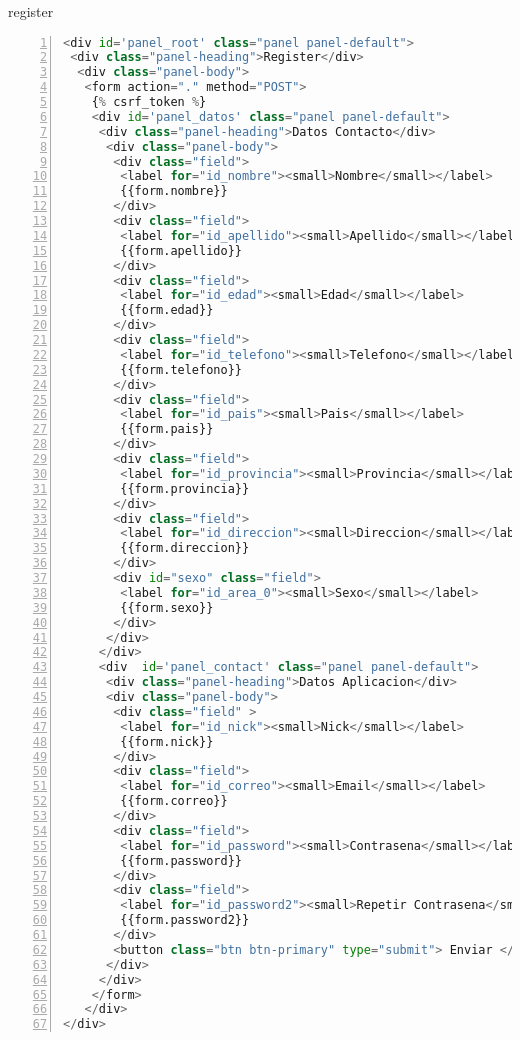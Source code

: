 register
\begin{lstlisting}[framerule=0pt,
aboveskip=0.5cm,
framextopmargin=3pt,
framexbottommargin=3pt,
framexleftmargin=0.4cm,
framesep=0pt,
rulesep=.4pt,
numbers=left,
numbersep=15pt,
numberstyle=\tiny,
numberfirstline = false,
breaklines=true,
frame=single,
stringstyle=\ttfamily,
showstringspaces = false,
basicstyle=\small\ttfamily,
keywordstyle=\bfseries,
rulesepcolor=\color{black},
captionpos=b,
language=Python,
caption=Register formato HTML.]
<div id='panel_root' class="panel panel-default">
 <div class="panel-heading">Register</div>
  <div class="panel-body">
   <form action="." method="POST">
    {% csrf_token %}
    <div id='panel_datos' class="panel panel-default">
     <div class="panel-heading">Datos Contacto</div>
      <div class="panel-body">
       <div class="field">
        <label for="id_nombre"><small>Nombre</small></label>
        {{form.nombre}}
       </div>
       <div class="field">
        <label for="id_apellido"><small>Apellido</small></label>
        {{form.apellido}}
       </div>
       <div class="field">
        <label for="id_edad"><small>Edad</small></label>
        {{form.edad}}
       </div>
       <div class="field">
        <label for="id_telefono"><small>Telefono</small></label>
        {{form.telefono}}
       </div>
       <div class="field">
        <label for="id_pais"><small>Pais</small></label>
        {{form.pais}}
       </div>
       <div class="field">
        <label for="id_provincia"><small>Provincia</small></label>
        {{form.provincia}}
       </div>
       <div class="field">
        <label for="id_direccion"><small>Direccion</small></label>
        {{form.direccion}}
       </div>
       <div id="sexo" class="field">
        <label for="id_area_0"><small>Sexo</small></label>
        {{form.sexo}}
       </div>
      </div>
     </div>
     <div  id='panel_contact' class="panel panel-default">
      <div class="panel-heading">Datos Aplicacion</div>
      <div class="panel-body">
       <div class="field" >
        <label for="id_nick"><small>Nick</small></label>
        {{form.nick}}
       </div>
       <div class="field">
        <label for="id_correo"><small>Email</small></label>
        {{form.correo}}
       </div>
       <div class="field">
        <label for="id_password"><small>Contrasena</small></label>
        {{form.password}}
       </div>
       <div class="field">
        <label for="id_password2"><small>Repetir Contrasena</small></label>
        {{form.password2}}
       </div>
       <button class="btn btn-primary" type="submit"> Enviar </button>
      </div>
     </div>
    </form>
   </div>
</div>
\end{lstlisting}

